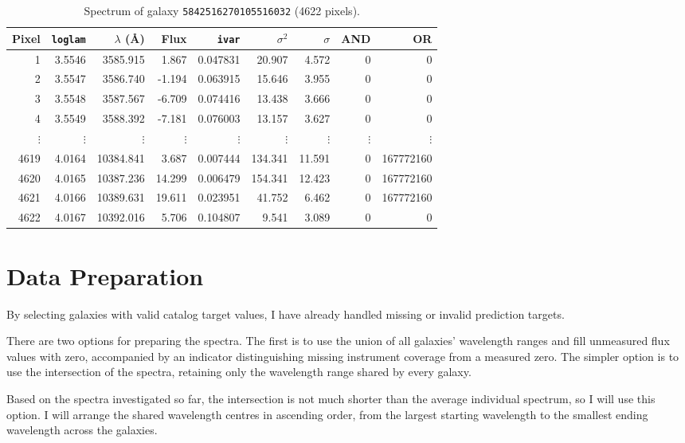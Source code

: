 \documentclass[12pt,a4paper]{article}
\begin{document}
\begin{table}[htbp]
\centering
\caption{Spectrum of galaxy \texttt{5842516270105516032} (4622 pixels).}
\label{tab:spectrum-two}
\begingroup
\footnotesize
\setlength{\tabcolsep}{3pt}
\begin{tabular}{rrrrrrrrr}
\toprule
Pixel & \texttt{loglam} & $\lambda$ (\AA) & Flux & \texttt{ivar} & $\sigma^2$ & $\sigma$ & AND & OR \\
\midrule
1 & 3.5546 & 3585.915 & 1.867 & 0.047831 & 20.907 & 4.572 & 0 & 0 \\
2 & 3.5547 & 3586.740 & -1.194 & 0.063915 & 15.646 & 3.955 & 0 & 0 \\
3 & 3.5548 & 3587.567 & -6.709 & 0.074416 & 13.438 & 3.666 & 0 & 0 \\
4 & 3.5549 & 3588.392 & -7.181 & 0.076003 & 13.157 & 3.627 & 0 & 0 \\
$\vdots$ & $\vdots$ & $\vdots$ & $\vdots$ & $\vdots$ & $\vdots$ & $\vdots$ & $\vdots$ & $\vdots$ \\
4619 & 4.0164 & 10384.841 & 3.687 & 0.007444 & 134.341 & 11.591 & 0 & 167772160 \\
4620 & 4.0165 & 10387.236 & 14.299 & 0.006479 & 154.341 & 12.423 & 0 & 167772160 \\
4621 & 4.0166 & 10389.631 & 19.611 & 0.023951 & 41.752 & 6.462 & 0 & 167772160 \\
4622 & 4.0167 & 10392.016 & 5.706 & 0.104807 & 9.541 & 3.089 & 0 & 0 \\
\bottomrule
\end{tabular}
\endgroup
\end{table}

\clearpage
\section{Data Preparation}

By selecting galaxies with valid catalog target values, I have already handled missing or invalid prediction targets.

There are two options for preparing the spectra. The first is to use the union of all galaxies' wavelength ranges and fill unmeasured flux values with zero, accompanied by an indicator distinguishing missing instrument coverage from a measured zero. The simpler option is to use the intersection of the spectra, retaining only the wavelength range shared by every galaxy.

Based on the spectra investigated so far, the intersection is not much shorter than the average individual spectrum, so I will use this option. I will arrange the shared wavelength centres in ascending order, from the largest starting wavelength to the smallest ending wavelength across the galaxies.
\end{document}

